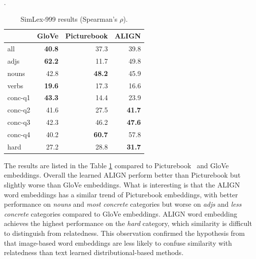 \documentclass{article}
\begin{document}
\begin{table}[h]
\begin{center}
\caption{SimLex-999 results (Spearman’s $\rho$).}
\label{tab:simlex}.
\begin{small}
\begin{tabular}{l|rrr}
\toprule
            & GloVe & Picturebook & \textbf{ALIGN} \\
\midrule
all         & \textbf{40.8} & 37.3 & 39.8 \\
adjs        & \textbf{62.2} & 11.7 & 49.8 \\
nouns       & 42.8 & \textbf{48.2} & 45.9 \\
verbs       & \textbf{19.6} & 17.3 & 16.6 \\
conc-q1     & \textbf{43.3} & 14.4 & 23.9 \\
conc-q2     & 41.6 & 27.5 & \textbf{41.7} \\
conc-q3     & 42.3 & 46.2 & \textbf{47.6} \\
conc-q4     & 40.2 & \textbf{60.7} & 57.8 \\
hard        & 27.2 & 28.8 & \textbf{31.7}\\
\bottomrule
\end{tabular}
\end{small}
\end{center}
\vskip -0.1in
\end{table}

The results are listed in the Table \ref{tab:simlex} compared to Picturebook~\cite{kiros:picturebook} and GloVe~\cite{pennington:glove} embeddings. Overall the learned ALIGN perform better than Picturebook but slightly worse than GloVe embeddings. What is interesting is that the ALIGN word embeddings has a similar trend of Picturebook embeddings, with better performance on \textit{nouns} and \textit{most concrete} categories but worse on \textit{adjs} and \textit{less concrete} categories compared to GloVe embeddings. 
ALIGN word embedding achieves the highest performance on the \textit{hard} category, which similarity is difficult to distinguish from relatedness. This observation confirmed the hypothesis from \citet{kiros:picturebook} that image-based word embeddings are less likely to confuse similarity with relatedness than text learned distributional-based methods. 
\end{document}
